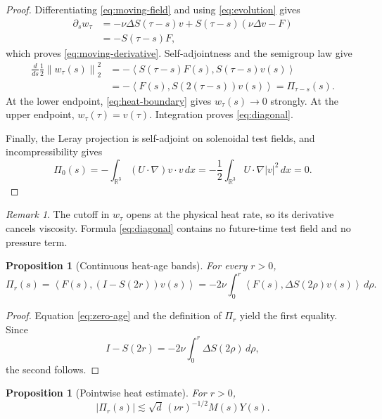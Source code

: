 \documentclass[11pt]{article}
\newtheorem{proposition}[theorem]{Proposition}
\theoremstyle{remark}
\newtheorem{remark}[theorem]{Remark}
\newcommand{\R}{\mathbb R}
\newcommand{\norm}[1]{\left\|#1\right\|}
\newcommand{\ip}[2]{\left\langle #1,#2\right\rangle}
\begin{document}
\begin{proof}
Differentiating \eqref{eq:moving-field} and using
\eqref{eq:evolution} gives
\[
\begin{aligned}
 \partial_sw_\tau
 &=-\nu\Delta S(\tau-s)v
   +S(\tau-s)(\nu\Delta v-F)\\
 &=-S(\tau-s)F,
\end{aligned}
\]
which proves \eqref{eq:moving-derivative}.  Self-adjointness and the
semigroup law give
\[
\begin{aligned}
 \frac{d}{ds}\frac12\norm{w_\tau(s)}_2^2
 &=-\ip{S(\tau-s)F(s)}{S(\tau-s)v(s)}\\
 &=-\ip{F(s)}{S(2(\tau-s))v(s)}
 =\Pi_{\tau-s}(s).
\end{aligned}
\]
At the lower endpoint, \eqref{eq:heat-boundary} gives
\(w_\tau(s)\to0\) strongly.  At the upper endpoint,
\(w_\tau(\tau)=v(\tau)\).  Integration proves
\eqref{eq:diagonal}.

Finally, the Leray projection is self-adjoint on solenoidal test fields,
and incompressibility gives
\[
 \Pi_0(s)
 =-\int_{\R^3}(U\cdot\nabla)v\cdot v\,dx
 =-\frac12\int_{\R^3}U\cdot\nabla|v|^2\,dx
 =0.
\]
\end{proof}

\begin{remark}
The cutoff in \(w_\tau\) opens at the physical heat rate, so its
derivative cancels viscosity.  Formula \eqref{eq:diagonal} contains no
future-time test field and no pressure term.
\end{remark}

\begin{proposition}[Continuous heat-age bands]
\label{prop:bands}
For every \(r>0\),
\begin{equation}
\label{eq:continuous-band}
 \boxed{
 \Pi_r(s)
 =
 \ip{F(s)}{(I-S(2r))v(s)}
 =
 -2\nu\int_0^r
 \ip{F(s)}{\Delta S(2\rho)v(s)}\,d\rho .
 }
\end{equation}
\end{proposition}

\begin{proof}
Equation \eqref{eq:zero-age} and the definition of \(\Pi_r\) yield the
first equality.  Since
\[
 I-S(2r)=-2\nu\int_0^r\Delta S(2\rho)\,d\rho,
\]
the second follows.
\end{proof}

\begin{proposition}[Pointwise heat estimate]
\label{prop:pointwise}
For \(r>0\),
\begin{equation}
\label{eq:pointwise}
 |\Pi_r(s)|
 \lesssim
 \sqrt d\,(\nu r)^{-1/2}M(s)Y(s).
\end{equation}
\end{proposition}
\end{document}
